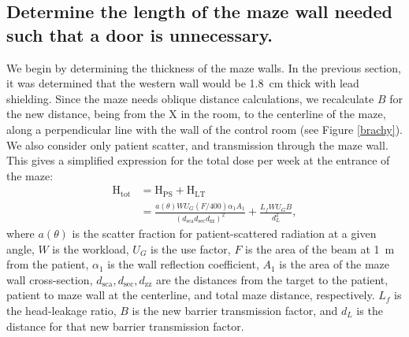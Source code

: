 \documentclass[%
aps,
mph,%
amsmath,amssymb,
preprint,%
tightenlines,
longbibliography,
superscriptaddress,
floatfix,
nofootinbib,
]{revtex4-2}
\begin{document}
    \subsection{Determine the length of the maze wall needed such that a door is unnecessary.}
        We begin by determining the thickness of the maze walls. In the previous section, it was determined that the western wall would be \qty{1.8}{cm} thick with lead shielding. Since the maze needs oblique distance calculations, we recalculate $B$ for the new distance, being from the X in the room, to the centerline of the maze, along a perpendicular line with the wall of the control room (see Figure \ref{brachy}). We also consider only patient scatter, and transmission through the maze wall. This gives a simplified expression for the total dose per week at the entrance of the maze:
        \begin{align} \label{bigboy}
            \mathrm{H_{tot}} &= \mathrm{H_{PS}} + \mathrm{H_{LT}} \\
            &=\frac{a(\theta)WU_G \left(F/400\right)\alpha_1 A_1}{\left( d_\mathrm{sca}d_\mathrm{sec}d_\mathrm{zz} \right)^2} + \frac{L_f W U_G B}{d_L^2}, \nonumber
        \end{align}
        where $a(\theta)$ is the scatter fraction for patient-scattered radiation at a given angle, $W$ is the workload, $U_G$ is the use factor, $F$ is the area of the beam at \qty{1}{m} from the patient, $\alpha_1$ is the wall reflection coefficient, $A_1$ is the area of the maze wall cross-section, $d_\mathrm{sca}, d_\mathrm{sec}, d_\mathrm{zz}$ are the distances from the target to the patient, patient to maze wall at the centerline, and total maze distance, respectively. $L_f$ is the head-leakage ratio, $B$ is the new barrier transmission factor, and $d_L$ is the distance for that new barrier transmission factor. 
\end{document}
